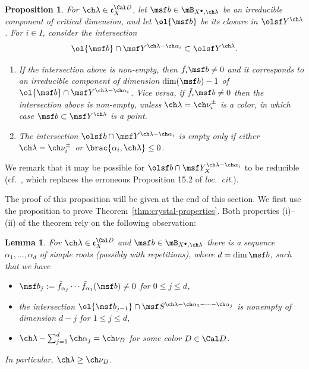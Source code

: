 \documentclass[final]{amsart}
\newtheorem{lem}[subsubsection]{Lemma}
\newtheorem{prop}[subsubsection]{Proposition}
\theoremstyle{remark}
\theoremstyle{definition}
\numberwithin{equation}{section}
\begin{document}
\begin{prop} \label{prop:f-hyper}
For $\ch\lambda\in \mathfrak c_X^{\Cal D}$, let $\msf b \in \mB_{X^\bullet,\ch\lambda}$ be an irreducible component of critical dimension, and let $\ol{\msf b}$
be its closure in $\olsf Y^{\ch\lambda}$. For $i\in I$, consider the
intersection 
\[ \ol{\msf b} \cap \msf Y^{\ch\lambda-\ch\alpha_i} \subset \olsf Y^{\ch\lambda}. \]

\begin{enumerate}
\item
If the intersection above is non-empty, then $\tilde f_i \msf b \ne 0$
and it corresponds to an irreducible component of dimension $\dim(\msf b) -1$
of $\ol{\msf b} \cap \msf Y^{\ch\lambda-\ch\alpha_i}$. Vice versa, if $\tilde f_i \msf b \ne 0$ then the intersection above is non-empty, unless $\ch\lambda=\ch\nu_i^\pm$ is a color, in which case $\msf b \subset \msf Y^{\ch\lambda}$ is a point. 

\item The intersection $\olsf b \cap \msf Y^{\ch\lambda-\ch\alpha_i}$ is empty
only if either $\ch\lambda=\ch\nu_i^\pm$ or $\brac{\alpha_i, \ch\lambda} \le 0$. 
\end{enumerate}
\end{prop}

We remark that it may be possible for $\olsf b \cap \msf Y^{\ch\lambda-\ch\alpha_i}_X$
to be reducible (cf.~\cite[Proposition 19.2]{BFG}, which replaces the erroneous 
Proposition 15.2 of \emph{loc.~cit.}). 

The proof of this proposition will be given at the end of this section. We first use 
the proposition to prove Theorem~\ref{thm:crystal-properties}. 
Both properties (i)--(ii) of the theorem rely on the following observation:

\begin{lem}
\label{lem:lowering}
  For $\ch\lambda \in \mathfrak c^{\Cal D}_X$ and $\msf b \in \mB_{X^\bullet,\ch\lambda}$
there is a sequence $\alpha_1, \dots,\alpha_d$ of simple roots (possibly with repetitions), where $d = \dim \msf b$, such that 
we have 
\begin{itemize}
\item $\msf b_j := \tilde f_{\alpha_{j}} \dotsb \tilde f_{\alpha_1}(\msf b) \ne 0$ 
for $0\le j \le d$,
\item 
the intersection $\ol{\msf b_{j-1}} \cap \msf S^{\ch\lambda - \ch\alpha_1 - \cdots -\ch\alpha_j}$ is nonempty of dimension $d-j$ for $1\le j \le d$, 
\item $\ch\lambda - \sum_{j=1}^d \ch\alpha_j = \ch\nu_D$ for some color $D \in \Cal D$.
\end{itemize} 
In particular, $\ch\lambda \ge \ch\nu_D$. 
\end{lem}
\end{document}
